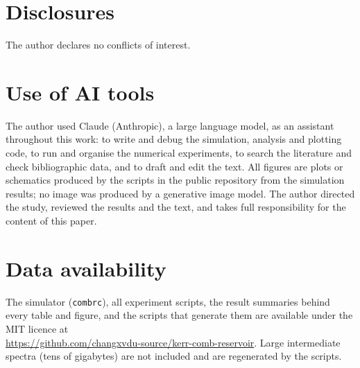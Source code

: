 \documentclass[11pt,a4paper]{article}
\begin{document}
\section*{Disclosures}
The author declares no conflicts of interest.

\section*{Use of AI tools}
The author used Claude (Anthropic), a large language model, as an assistant throughout this work: to write and debug the simulation,
analysis and plotting code, to run and organise the numerical experiments, to search the literature and check bibliographic data, and
to draft and edit the text. All figures are plots or schematics produced by the scripts in the public repository from the simulation
results; no image was produced by a generative image model. The author directed the study, reviewed the results and the text, and takes
full responsibility for the content of this paper.

\section*{Data availability}
The simulator (\texttt{combrc}), all experiment scripts, the result summaries behind every table and figure, and the scripts that
generate them are available under the MIT licence at\\
\url{https://github.com/changxvdu-source/kerr-comb-reservoir}.
Large intermediate spectra (tens of gigabytes) are not included and are regenerated by the scripts.



\end{document}
